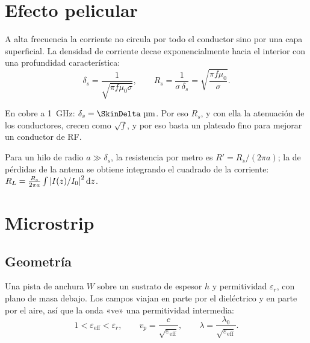\section{Efecto pelicular}

A alta frecuencia la corriente no circula por todo el conductor sino por una capa superficial. La densidad de corriente decae
exponencialmente hacia el interior con una profundidad característica:
\begin{equation}
  \delta_s = \frac{1}{\sqrt{\pi f \mu_0 \sigma}}, \qquad R_s = \frac{1}{\sigma\,\delta_s} = \sqrt{\frac{\pi f\mu_0}{\sigma}} .
\end{equation}
\begin{donde}
\end{donde}
En cobre a \SI{1}{\giga\hertz}: $\delta_s = \SkinDelta~\si{\micro\metre}$. Por eso $R_s$, y con ella la atenuación de los conductores,
crecen como $\sqrt f$, y por eso basta un plateado fino para mejorar un conductor de RF.

Para un hilo de radio $a \gg \delta_s$, la resistencia por metro es $R' = R_s/(2\pi a)$; la de pérdidas de la antena se obtiene integrando
el cuadrado de la corriente: $R_L = \frac{R_s}{2\pi a}\int \left|I(z)/I_0\right|^2\mathrm{d} z$.

\section{Microstrip}

\subsection{Geometría}
Una pista de anchura $W$ sobre un sustrato de espesor $h$ y permitividad $\varepsilon_r$, con plano de masa debajo. Los campos viajan en parte
por el dieléctrico y en parte por el aire, así que la onda «ve» una permitividad intermedia:
\begin{equation}
  1 < \varepsilon_{\text{eff}} < \varepsilon_r, \qquad v_p = \frac{c}{\sqrt{\varepsilon_{\text{eff}}}}, \qquad \lambda = \frac{\lambda_0}{\sqrt{\varepsilon_{\text{eff}}}}.
\end{equation}
\begin{donde}
\end{donde}

